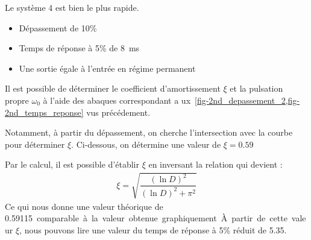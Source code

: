 Le système 4 est bien le plus rapide.
\begin{itemize}
    \item Dépassement de 10\%
    \item Temps de réponse à 5\% de \SI{8}{\milli\second}
    \item Une sortie égale à l'entrée en régime permanent 
\end{itemize}
Il est possible de déterminer le coefficient d'amortissement $\xi$ et la 
pulsation propre $\omega_0$ à l'aide des abaques correspondant a
ux~\cref{fig-2nd_depassement_2,fig-2nd_temps_reponse} vus précédement.

Notamment, à partir du dépassement, on cherche l'intersection avec la courbe
pour déterminer $\xi$. Ci-dessous, on détermine une valeur de $\xi=0.59$
\begin{center}

\end{center}
Par le calcul, il est possible d'établir $\xi$ en inversant la relation
 qui devient :
\begin{align*}
    \xi=\sqrt{\dfrac{(\ln D)^2}{(\ln D)^2+\pi^2}}
\end{align*}
Ce qui nous donne une valeur théorique de \SI{0.59115} comparable à la valeur
obtenue graphiquement.

À partir de cette valeur $\xi$, nous pouvons lire une valeur du temps de réponse
à 5\% réduit de 5.35.
\begin{center}

\end{center}

